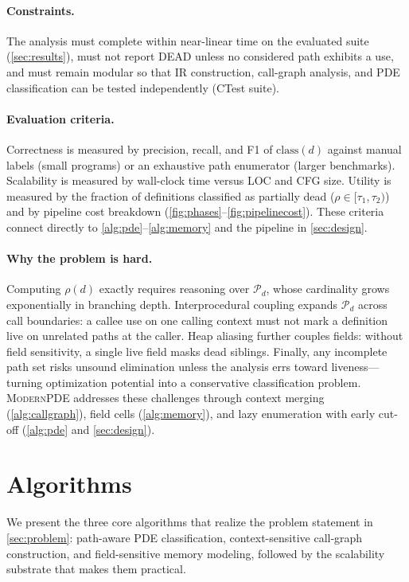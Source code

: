 \documentclass[acmsmall,screen,review,anonymous]{acmart}
\begin{document}
\paragraph{Constraints.}
The analysis must complete within near-linear time on the evaluated suite (\autoref{sec:results}), must not report DEAD unless no considered path exhibits a use, and must remain modular so that IR construction, call-graph analysis, and PDE classification can be tested independently (CTest suite).

\paragraph{Evaluation criteria.}
Correctness is measured by precision, recall, and F1 of $\mathrm{class}(d)$ against manual labels (small programs) or an exhaustive path enumerator (larger benchmarks). Scalability is measured by wall-clock time versus LOC and CFG size. Utility is measured by the fraction of definitions classified as partially dead ($\rho\in[\tau_1,\tau_2)$) and by pipeline cost breakdown (\autoref{fig:phases}--\autoref{fig:pipelinecost}). These criteria connect directly to \autoref{alg:pde}--\autoref{alg:memory} and the pipeline in \autoref{sec:design}.

\paragraph{Why the problem is hard.}
Computing $\rho(d)$ exactly requires reasoning over $\mathcal{P}_d$, whose cardinality grows exponentially in branching depth. Interprocedural coupling expands $\mathcal{P}_d$ across call boundaries: a callee use on one calling context must not mark a definition live on unrelated paths at the caller. Heap aliasing further couples fields: without field sensitivity, a single live field masks dead siblings. Finally, any incomplete path set risks unsound elimination unless the analysis errs toward liveness---turning optimization potential into a conservative classification problem. \textsc{ModernPDE} addresses these challenges through context merging (\autoref{alg:callgraph}), field cells (\autoref{alg:memory}), and lazy enumeration with early cut-off (\autoref{alg:pde} and \autoref{sec:design}).

\section{Algorithms}
\label{sec:algorithms}
We present the three core algorithms that realize the problem statement in \autoref{sec:problem}: path-aware PDE classification, context-sensitive call-graph construction, and field-sensitive memory modeling, followed by the scalability substrate that makes them practical.
\end{document}
